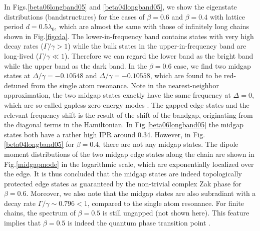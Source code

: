 \documentclass[aps,pra,reprint,groupedaddress,nofootinbib,longbibliography,showpacs]{revtex4-1}
\begin{document}
In Figs.\ref{beta06longband05} and \ref{beta04longband05}, we show the eigenstate distributions (bandstructures) for the cases of $\beta=0.6$ and $\beta=0.4$ with lattice period $d=0.5\lambda_0$, which are almost the same with those of infinitely long chains shown in Fig.\ref{figcda}. The lower-in-frequency band contains states with very high decay rates ($\Gamma/\gamma>1$) while the bulk states in the upper-in-frequency band are long-lived ($\Gamma/\gamma\ll1$). Therefore we can regard the lower band as the bright band while the upper band as the dark band. In the $\beta=0.6$ case, we find two midgap states at $\Delta/\gamma=-0.10548$ and $\Delta/\gamma=-0.10558$, which are found to be red-detuned from the single atom resonance. Note in the nearest-neighbor approximation, the two midgap states exactly have the same frequency at $\Delta=0$, which are so-called gapless zero-energy modes \cite{asboth2016short,zhangPRB2018}. The gapped edge states and the relevant frequency shift is the result of the shift of the bandgap, originating from the diagonal terms in the Hamiltonian. In Fig.\ref{beta06longband05} the midgap states both have a rather high IPR around 0.34. However, in Fig.\ref{beta04longband05} for $\beta=0.4$, there are not any midgap states. The dipole moment distributions of the two midgap edge states along the chain are shown in Fig.\ref{midgapmode} in the logarithmic scale, which are exponentially localized over the edge. It is thus concluded that the midgap states are indeed topologically protected edge states as guaranteed by the non-trivial complex Zak phase for $\beta=0.6$. Moreover, we also note that the midgap states are also subradiant with a decay rate $\Gamma/\gamma\sim0.796<1$, compared to the single atom resonance. For finite chains, the spectrum of $\beta=0.5$ is still ungapped (not shown here). This feature implies that $\beta=0.5$ is indeed the quantum phase transition point \cite{lieuPRB2018}.
\end{document}

